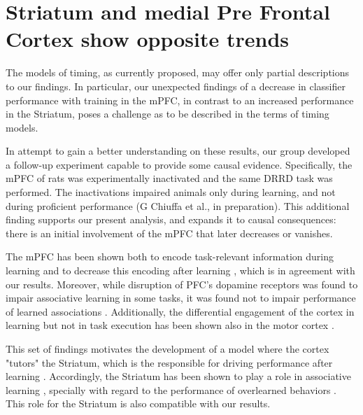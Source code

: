 

\section{Striatum and medial Pre Frontal Cortex show opposite trends}
    The models of timing, as currently proposed, may offer only partial descriptions to our findings. In particular, our unexpected findings of a decrease in classifier performance with training in the mPFC, in contrast to an increased performance in the Striatum, poses a challenge as to be described in the terms of timing models.
    
    In attempt to gain a better understanding on these results, our group developed a follow-up experiment capable to provide some causal evidence. Specifically, the mPFC of rats was experimentally inactivated and the same DRRD task was performed. The inactivations impaired animals only during learning, and not during proficient performance (G Chiuffa et al., in preparation). This additional finding supports our present analysis, and expands it to causal consequences: there is an initial involvement of the mPFC that later decreases or vanishes.
    
    The mPFC has been shown both to encode task-relevant information during learning \cite{kaplan2017role} and to decrease this encoding after learning \cite{schuck2015medial}, which is in agreement with our results. Moreover, while disruption of PFC's dopamine receptors was found to impair associative learning in some tasks, it was found not to impair performance of learned associations \cite{puig2012role, puig2014prefrontal}. Additionally, the differential engagement of the cortex in learning but not in task execution has been shown also in the motor cortex \cite{kawai2015motor}. 
    
    This set of findings motivates the development of a model where the cortex "tutors" the Striatum, which is the responsible for driving performance after learning \cite{murray2017learning}. Accordingly, the Striatum has been shown to play a role in associative learning \cite{li2011differential,liljeholm2012contributions}, specially with regard to the performance of overlearned behaviors \cite{smith2013dual}. This role for the Striatum is also compatible with our results.
    
